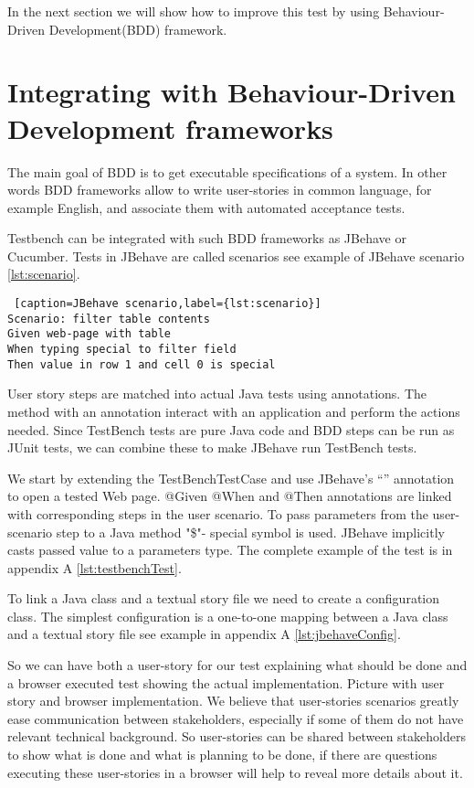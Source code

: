 In the next section we will show how to improve this test by using
Behaviour-Driven Development(BDD) framework.

\section{Integrating with Behaviour-Driven Development frameworks}

The main goal of BDD is to get executable specifications of a system.
In other words BDD frameworks allow  to write user-stories in
common language, for example English, and associate them with automated
acceptance tests.

Testbench can be integrated with such BDD frameworks as JBehave
\cite{jBehaveSite} or Cucumber\cite{cucumberSite}.
Tests in JBehave are called scenarios see example of JBehave scenario
\ref{lst:scenario}.

 \lstset{style=console}
  \begin{lstlisting} [caption=JBehave scenario,label={lst:scenario}]
Scenario: filter table contents
Given web-page with table
When typing special to filter field
Then value in row 1 and cell 0 is special
  \end{lstlisting}
User story steps are matched into actual Java tests using annotations. 
The method with an annotation interact with an application and perform the actions needed.
Since TestBench tests are pure Java code and BDD steps can be run as JUnit tests, we can combine these to make
JBehave run TestBench tests.

We start by extending the TestBenchTestCase  and use JBehave's ``\@BeforeScenario''
annotation to open a tested Web page.  @Given @When and @Then annotations are
linked with corresponding steps in the user scenario.
To pass parameters from the user-scenario step to a Java method "\$"- special symbol is used.
JBehave implicitly casts passed value to a parameters type. The complete example
of the test is in appendix A \ref{lst:testbenchTest}.

To link a Java class and a textual story file we need to create a configuration class.
The simplest configuration is a one-to-one mapping between a Java class and a textual story file
see example in appendix A \ref{lst:jbehaveConfig}. 

So we can have both a user-story for our test explaining what should be done and a browser executed
test showing the actual implementation. Picture with user story and browser implementation. We believe that user-stories 
scenarios greatly ease communication between stakeholders, 
especially if some of them do not have relevant technical background.
So user-stories can be shared between stakeholders to show what is done and what
is planning to be done, if there are questions 
executing these user-stories in a browser will help to reveal more details about it. 
